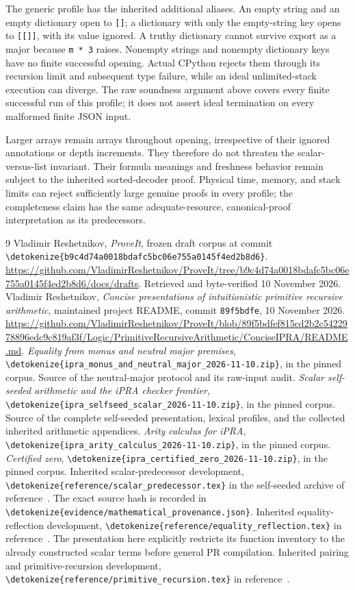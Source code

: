 \documentclass[11pt]{article}
\theoremstyle{definition}\newtheorem{definition}[theorem]{Definition}
\newcommand{\file}[1]{\expandafter\nolinkurl\expandafter{\detokenize{#1}}}
\begin{document}
The generic profile has the inherited additional aliases.  An empty
string and an empty dictionary open to \texttt{[]}; a dictionary with
only the empty-string key opens to \texttt{[[]]}, with its value ignored.
A truthy dictionary cannot survive export as a major because
\texttt{m * 3} raises.  Nonempty strings and nonempty dictionary keys
have no finite successful opening.  Actual CPython rejects them through
its recursion limit and subsequent type failure, while an ideal
unlimited-stack execution can diverge.  The raw soundness argument
above covers every finite successful run of this profile; it does not
assert ideal termination on every malformed finite JSON input.

Larger arrays remain arrays throughout opening, irrespective of their
ignored annotations or depth increments.  They therefore do not
threaten the scalar-versus-list invariant.  Their formula meanings and
freshness behavior remain subject to the inherited sorted-decoder
proof.  Physical time, memory, and stack limits can reject sufficiently
large genuine proofs in every profile; the completeness claim has the
same adequate-resource, canonical-proof interpretation as its
predecessors.


\begin{thebibliography}{9}
 Vladimir Reshetnikov, \emph{ProveIt}, frozen draft corpus
at commit \file{b9c4d74a0018bdafc5bc06e755a0145f4ed2b8d6}.
\url{https://github.com/VladimirReshetnikov/ProveIt/tree/b9c4d74a0018bdafc5bc06e755a0145f4ed2b8d6/docs/drafts}.
Retrieved and byte-verified 10 November 2026.
 Vladimir Reshetnikov, \emph{Concise presentations of
intuitionistic primitive recursive arithmetic}, maintained project README,
commit \texttt{89f5bdfe}, 10 November 2026.
\url{https://github.com/VladimirReshetnikov/ProveIt/blob/89f5bdfef815cd2b2c5422978896edc9c819af3f/Logic/PrimitiveRecursiveArithmetic/ConciseIPRA/README.md}.
 \emph{Equality from monus and neutral major premises},
\file{ipra_monus_and_neutral_major_2026-11-10.zip}, in the pinned corpus.
Source of the neutral-major protocol and its raw-input audit.
 \emph{Scalar self-seeded arithmetic and the iPRA checker
frontier}, \file{ipra_selfseed_scalar_2026-11-10.zip}, in the pinned corpus.
Source of the complete self-seeded presentation, lexical profiles,
and the collected inherited arithmetic appendices.
 \emph{Arity calculus for iPRA},
\file{ipra_arity_calculus_2026-11-10.zip}, in the pinned corpus.
 \emph{Certified zero},
\file{ipra_certified_zero_2026-11-10.zip}, in the pinned corpus.
 Inherited scalar-predecessor development,
\file{reference/scalar_predecessor.tex} in the self-seeded archive
of reference~\cite{selfseed}. The exact source hash is recorded in
\file{evidence/mathematical_provenance.json}.
 Inherited equality-reflection development,
\file{reference/equality_reflection.tex} in reference~\cite{selfseed}.
The presentation here explicitly restricts its function inventory to the
already constructed scalar terms before general PR compilation.
 Inherited pairing and primitive-recursion development,
\file{reference/primitive_recursion.tex} in reference~\cite{selfseed}.
\end{thebibliography}
\end{document}
